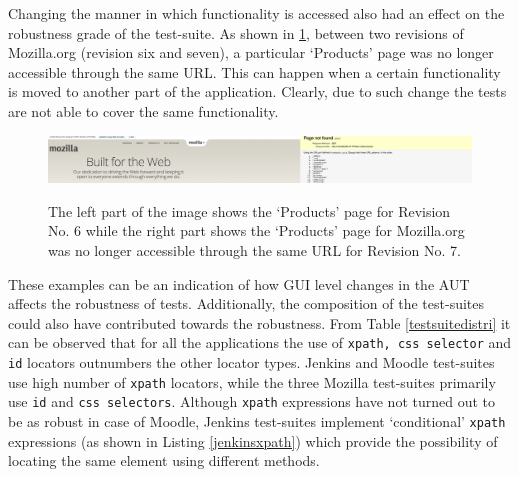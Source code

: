 



Changing the manner in which functionality is accessed also had an effect on the robustness grade of the test-suite. As shown in \ref{fig:bedrockchanges}, between two revisions of Mozilla.org (revision six and seven), a particular `Products' page was no longer accessible through the same URL. This can happen when a certain functionality is moved to another part of the application. Clearly, due to such change the tests are not able to cover the same functionality. 

\begin{figure}[ht!] 
\centering     %
{\label{rob:bedrock1}\includegraphics[width=\linewidth]{./Figures/bedrock1}}
\captionsetup{justification=justified,
singlelinecheck=false}
\caption{ The left part of the image shows the `Products' page for Revision No. 6 while the right part shows the `Products' page for Mozilla.org was no longer accessible through the same URL for Revision No. 7.}
\label{fig:bedrockchanges}
\end{figure} 

These examples can be an indication of how GUI level changes in the AUT affects the robustness of tests. Additionally, the composition of the test-suites could also have contributed towards the robustness. From Table \ref{testsuitedistri} it can be observed that for all the applications the use of \texttt{xpath, css selector} and \texttt{id} locators outnumbers the other locator types. Jenkins and Moodle test-suites use high number of \texttt{xpath} locators, while the three Mozilla test-suites primarily use \texttt{id} and \texttt{css selectors}. Although \texttt{xpath} expressions have not turned out to be as robust in case of Moodle, Jenkins test-suites implement `conditional' \texttt{xpath} expressions (as shown in Listing \ref{jenkinsxpath}) which provide the possibility of locating the same element using different methods. 

